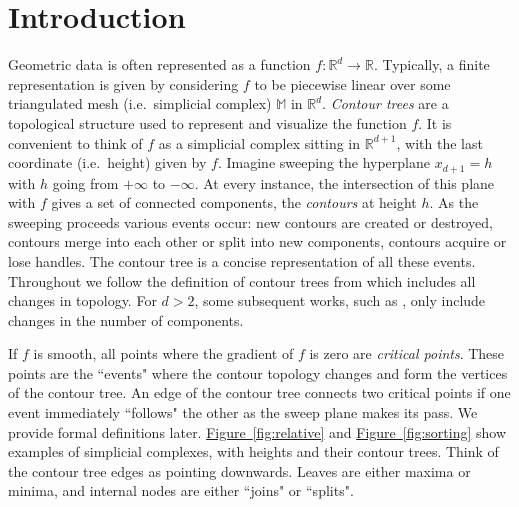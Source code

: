 \documentclass[11pt]{article}
\theoremstyle{definition}
\newcommand{\MM}{\mathbb{M}}
\newcommand{\RR}{\mathbb{R}}
\newcommand{\Fig}[1]{\hyperref[fig:#1]{Figure~\ref*{fig:#1}}} %
\begin{document}
\newpage
{}

\section{Introduction}

Geometric data is often represented as a function $f: \RR^d \to \RR$. Typically, a finite representation is given
by considering $f$ to be piecewise linear over some triangulated mesh (i.e.\ simplicial complex) $\MM$ in $\RR^d$.
\emph{Contour trees} are a topological structure used to represent and visualize
the function $f$. 
It is convenient to think of $f$ as a simplicial complex sitting in $\RR^{d+1}$,
with the last coordinate (i.e.\ height) given by $f$. Imagine sweeping the hyperplane $x_{d+1} = h$
with $h$ going from $+\infty$ to $-\infty$. At every instance, the intersection of this plane 
with $f$ gives a set of connected components, the \emph{contours} at height $h$. As the sweeping 
proceeds various events occur: new contours are created or destroyed, contours merge into each other or
split into new components, contours acquire or lose handles. 
The contour tree is a concise representation of all these events.
Throughout we follow the definition of contour trees from \cite{kobps-ctsssit-97} which includes all changes in topology.  
For $d>2$, some subsequent works, such as \cite{csa-cctad-03}, only include changes in the number of components.

If $f$ is smooth, all points where the gradient of $f$ is zero are \emph{critical points}.
These points are the ``events" where the contour topology changes and form the vertices of the contour tree. 
An edge of the contour tree connects two critical points if one event immediately ``follows"
the other as the sweep plane makes its pass. We provide formal definitions later. 
\Fig{relative} and \Fig{sorting} 
show examples of simplicial complexes, with heights and their contour trees.
Think of the contour tree edges as pointing downwards. Leaves are either maxima or minima,
and internal nodes are either ``joins" or ``splits".

\end{document}
